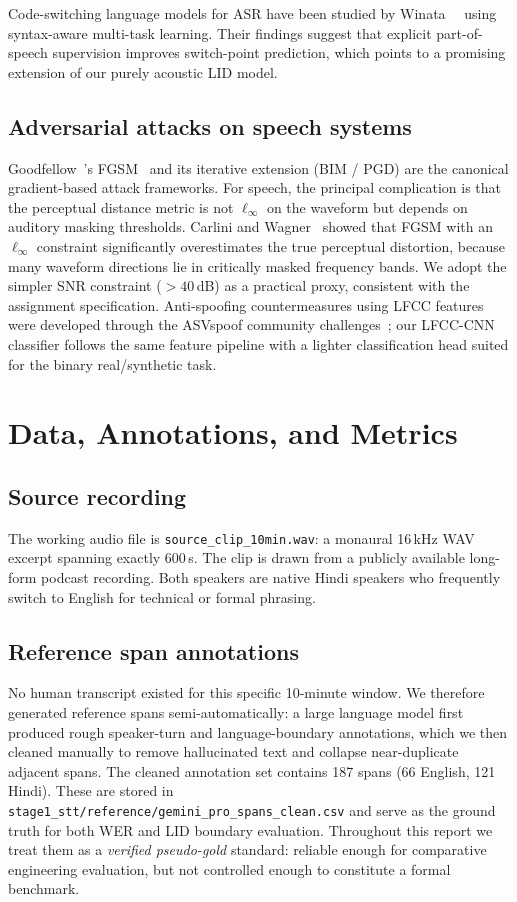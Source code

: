 \documentclass[10pt,twocolumn,letterpaper]{article}
\begin{document}
Code-switching language models for ASR have been studied by
Winata~\etal~\cite{winata2019code} using syntax-aware multi-task
learning.  Their findings suggest that explicit part-of-speech
supervision improves switch-point prediction, which points to a
promising extension of our purely acoustic LID model.

\subsection{Adversarial attacks on speech systems}
Goodfellow~\etal's FGSM~\cite{goodfellow2015fgsm} and its iterative
extension (BIM / PGD) are the canonical gradient-based attack
frameworks.  For speech, the principal complication is that the
perceptual distance metric is not $\ell_\infty$ on the waveform but
depends on auditory masking thresholds.  Carlini and
Wagner~\cite{carlini2017cwattack} showed that FGSM with an
$\ell_\infty$ constraint significantly overestimates the true
perceptual distortion, because many waveform directions lie in
critically masked frequency bands.  We adopt the simpler SNR
constraint (${>}40$\,dB) as a practical proxy, consistent with the
assignment specification.  Anti-spoofing countermeasures using LFCC
features were developed through the ASVspoof community
challenges~\cite{nautsch2021asvspoof,sahidullah2015cqcc}; our
LFCC-CNN classifier follows the same feature pipeline with a lighter
classification head suited for the binary real/synthetic task.

\section{Data, Annotations, and Metrics}
\label{sec:data}

\subsection{Source recording}
The working audio file is \texttt{source\_clip\_10min.wav}: a monaural
16\,kHz WAV excerpt spanning exactly 600\,s.  The clip is drawn from
a publicly available long-form podcast recording.  Both speakers
are native Hindi speakers who frequently switch to English for
technical or formal phrasing.

\subsection{Reference span annotations}
No human transcript existed for this specific 10-minute window.  We
therefore generated reference spans semi-automatically: a large
language model first produced rough speaker-turn and language-boundary
annotations, which we then cleaned manually to remove hallucinated
text and collapse near-duplicate adjacent spans.  The cleaned
annotation set contains 187 spans (66 English, 121 Hindi).  These
are stored in \texttt{stage1\_stt/reference/gemini\_pro\_spans\_clean.csv}
and serve as the ground truth for both WER and LID boundary evaluation.
Throughout this report we treat them as a \emph{verified pseudo-gold}
standard: reliable enough for comparative engineering evaluation, but
not controlled enough to constitute a formal benchmark.
\end{document}

